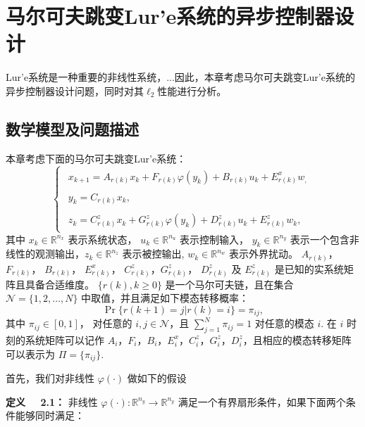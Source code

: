 
\chapter{马尔可夫跳变Lur'e系统的异步控制器设计}
Lur'e系统是一种重要的非线性系统，...因此，本章考虑马尔可夫跳变Lur'e系统的异步控制器设计问题，同时对其$\ell_2$性能进行分析。

\section{数学模型及问题描述}
	本章考虑下面的马尔可夫跳变Lur'e系统：
	\begin{equation}\label{syseq}\left\{
	\begin{array}{lr}
		\begin{split}
			x_{k+1}=A_{r(k)}x_k+F_{r(k)}\varphi(y_k)+B_{r(k)}u_k +E^x_{r(k)}w_,
		\end{split}\\
		\begin{split}
			y_k=C_{r(k)}x_k,
		\end{split}
		\\
		\begin{split}
			z_k= C^z_{r(k)}x_k+G^z_{r(k)}\varphi(y_k)+D^z_{r(k)}u_k+E^z_{r(k)}w_k,
		\end{split}	
	\end{array}\right.
	\end{equation}
	其中 $x_k\in\mathbb{R}^{n_x}$ 表示系统状态， $u_k\in\mathbb{R}^{n_u}$ 表示控制输入， $y_k\in\mathbb{R}^{n_y}$ 表示一个包含非线性的观测输出，$ z_k\in\mathbb{R}^{n_z}$ 表示被控输出, $w_k\in\mathbb{R}^{n_w}$ 表示外界扰动。 $A_{r(k)}$， $F_{r(k)}$， $B_{r(k)}$， $E^x_{r(k)}$， $C^z_{r(k)}$，$G^z_{r(k)}$， $D^z_{r(k)}$ 及 $E^z_{r(k)}$ 是已知的实系统矩阵且具备合适维度。
	$\{r(k),k\geq0\}$ 是一个马尔可夫链，且在集合 $\mathcal{N}=\{1,2,\dots,N\}$ 中取值，并且满足如下模态转移概率：
	\begin{equation}
	\Pr\{r(k+1)=j|r(k)=i\}=\pi_{ij},
	\end{equation}
	其中 $\pi_{ij}\in[0,1]$， 对任意的 $i,j\in\mathcal{N}$，且 $\sum_{j=1}^{N}\pi_{ij}=1$ 对任意的模态 $i$. 在 $i$ 时刻的系统矩阵可以记作 $A_i$，$F_i$，$B_i$，$E^x_i$，$C^z_i$，$G^z_i$，$D^z_i$，且相应的模态转移矩阵可以表示为 $\varPi=\{\pi_{ij}\}$.
	
	首先，我们对非线性 $\varphi(\cdot)$ 做如下的假设
	
	{\bf 定义 \ \ 2.1：} 
	非线性 $\varphi(\cdot): \mathbb{R}^{n_y}\rightarrow\mathbb{R}^{n_y}$ 满足一个有界扇形条件，如果下面两个条件能够同时满足：
		
